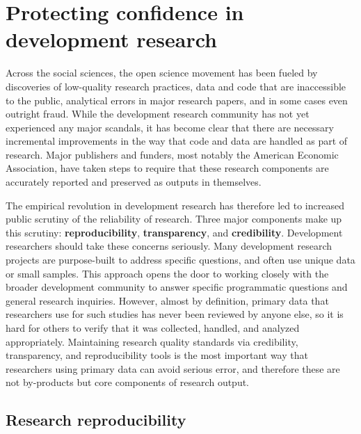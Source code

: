 
\section{Protecting confidence in development research}

Across the social sciences, the open science movement
has been fueled by discoveries of low-quality research practices,
data and code that are inaccessible to the public,
analytical errors in major research papers,
and in some cases even outright fraud.
While the development research community has not yet
experienced any major scandals,
it has become clear that there are necessary incremental improvements
in the way that code and data are handled as part of research.
Major publishers and funders, most notably the American Economic Association,
have taken steps to require that these research components
are accurately reported and preserved as outputs in themselves.

The empirical revolution in development research
has therefore led to increased public scrutiny of the reliability of research.\cite{rogers_2017}
Three major components make up this scrutiny: \textbf{reproducibility}\cite{duvendack2017meant}, \textbf{transparency},\cite{christensen2018transparency} and \textbf{credibility}.\cite{ioannidis2017power}
Development researchers should take these concerns seriously.
Many development research projects are purpose-built to address specific questions,
and often use unique data or small samples.
This approach opens the door to working closely with the broader development community
to answer specific programmatic questions and general research inquiries.
However, almost by definition,
primary data that researchers use for such studies has never been reviewed by anyone else,
so it is hard for others to verify that it was collected, handled, and analyzed appropriately.
Maintaining research quality standards via credibility, transparency, and reproducibility tools
is the most important way that researchers using primary data can avoid serious error,
and therefore these are not by-products but core components of research output.

\subsection{Research reproducibility}

